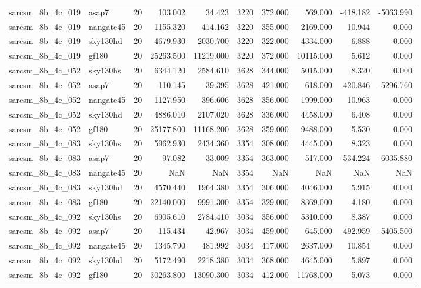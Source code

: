 \begin{tabular}{llrrrrrrrr}
sarcsm\_8b\_4c\_019 & asap7 & 20 & 103.002 & 34.423 & 3220 & 372.000 & 569.000 & -418.182 & -5063.990 \\
sarcsm\_8b\_4c\_019 & nangate45 & 20 & 1155.320 & 414.162 & 3220 & 355.000 & 2169.000 & 10.944 & 0.000 \\
sarcsm\_8b\_4c\_019 & sky130hd & 20 & 4679.930 & 2030.700 & 3220 & 322.000 & 4334.000 & 6.888 & 0.000 \\
sarcsm\_8b\_4c\_019 & gf180 & 20 & 25263.500 & 11219.000 & 3220 & 372.000 & 10115.000 & 5.612 & 0.000 \\
sarcsm\_8b\_4c\_052 & sky130hs & 20 & 6344.120 & 2584.610 & 3628 & 344.000 & 5015.000 & 8.320 & 0.000 \\
sarcsm\_8b\_4c\_052 & asap7 & 20 & 110.145 & 39.395 & 3628 & 421.000 & 618.000 & -420.846 & -5296.760 \\
sarcsm\_8b\_4c\_052 & nangate45 & 20 & 1127.950 & 396.606 & 3628 & 356.000 & 1999.000 & 10.963 & 0.000 \\
sarcsm\_8b\_4c\_052 & sky130hd & 20 & 4886.010 & 2107.020 & 3628 & 336.000 & 4458.000 & 6.408 & 0.000 \\
sarcsm\_8b\_4c\_052 & gf180 & 20 & 25177.800 & 11168.200 & 3628 & 359.000 & 9488.000 & 5.530 & 0.000 \\
sarcsm\_8b\_4c\_083 & sky130hs & 20 & 5962.930 & 2434.360 & 3354 & 308.000 & 4445.000 & 8.323 & 0.000 \\
sarcsm\_8b\_4c\_083 & asap7 & 20 & 97.082 & 33.009 & 3354 & 363.000 & 517.000 & -534.224 & -6035.880 \\
sarcsm\_8b\_4c\_083 & nangate45 & 20 & NaN & NaN & 3354 & NaN & NaN & NaN & NaN \\
sarcsm\_8b\_4c\_083 & sky130hd & 20 & 4570.440 & 1964.380 & 3354 & 306.000 & 4046.000 & 5.915 & 0.000 \\
sarcsm\_8b\_4c\_083 & gf180 & 20 & 22140.000 & 9991.300 & 3354 & 329.000 & 8369.000 & 4.180 & 0.000 \\
sarcsm\_8b\_4c\_092 & sky130hs & 20 & 6905.610 & 2784.410 & 3034 & 356.000 & 5310.000 & 8.387 & 0.000 \\
sarcsm\_8b\_4c\_092 & asap7 & 20 & 115.434 & 42.967 & 3034 & 459.000 & 645.000 & -492.959 & -5405.500 \\
sarcsm\_8b\_4c\_092 & nangate45 & 20 & 1345.790 & 481.992 & 3034 & 417.000 & 2637.000 & 10.854 & 0.000 \\
sarcsm\_8b\_4c\_092 & sky130hd & 20 & 5172.490 & 2218.380 & 3034 & 368.000 & 4645.000 & 5.897 & 0.000 \\
sarcsm\_8b\_4c\_092 & gf180 & 20 & 30263.800 & 13090.300 & 3034 & 412.000 & 11768.000 & 5.073 & 0.000 \\

\end{tabular}
